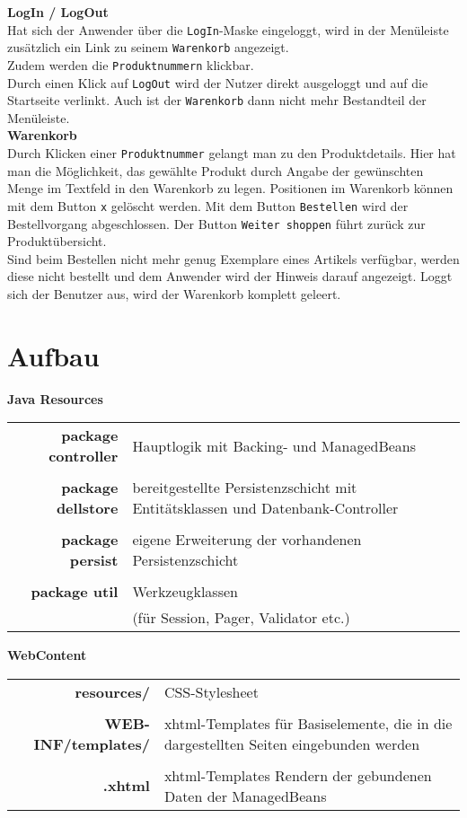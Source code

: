 \documentclass [a4paper]{article}
\begin{document}
\newpage\noindent\textbf{LogIn / LogOut}\\
Hat sich der Anwender über die \texttt{LogIn}-Maske eingeloggt, wird in der
Menüleiste zusätzlich ein Link zu seinem \texttt{Warenkorb} angezeigt.\\
Zudem werden die \texttt{Produktnummern} klickbar.\\
Durch einen Klick auf \texttt{LogOut} wird der Nutzer direkt ausgeloggt und 
auf die Startseite verlinkt. Auch ist der \texttt{Warenkorb} dann nicht mehr Bestandteil der Menüleiste.
\\

\noindent\textbf{Warenkorb}\\
Durch Klicken einer \texttt{Produktnummer} gelangt man zu den Produktdetails.
Hier hat man die Möglichkeit, das gewählte Produkt durch Angabe der gewünschten
Menge im Textfeld in den Warenkorb zu legen.
 Positionen im Warenkorb können mit dem Button \texttt{x} gelöscht
werden.
Mit dem Button \texttt{Bestellen} wird der Bestellvorgang abgeschlossen.
Der Button \texttt{Weiter shoppen} führt zurück zur Produktübersicht.\\
Sind beim Bestellen nicht mehr genug Exemplare eines Artikels verfügbar, 
werden diese nicht bestellt und dem Anwender wird der Hinweis darauf angezeigt.
 Loggt sich der Benutzer aus, wird der Warenkorb komplett geleert.
\\

\section{Aufbau}
\textbf{Java Resources}
\begin{longtable}{r | p{6.5cm}}
	\textbf{package controller} & Hauptlogik mit Backing- und Managed\-Beans\\\\ 
	\textbf{package dellstore} & bereitgestellte Persistenzschicht mit \-Entitätsklassen und Datenbank-Controller	\\\\
	\textbf{package persist} & eigene Erweiterung der vorhandenen Persistenz\-schicht \\\\
	\textbf{package util} & Werkzeugklassen \\ &(für Session, Pager, Validator etc.) \\
\end{longtable}
\noindent\textbf{WebContent}
\begin{longtable}{r | p{5.5cm}}
	\textbf{resources/} & CSS-Stylesheet \\\\
	\textbf{WEB-INF/templates/} & xhtml-Templates für Basiselemente, die in die dargestellten Seiten eingebunden werden \\\\
	\textbf{.xhtml} & xhtml-Templates Rendern der gebundenen Daten der ManagedBeans \\
	

\end{longtable}
\end{document}
